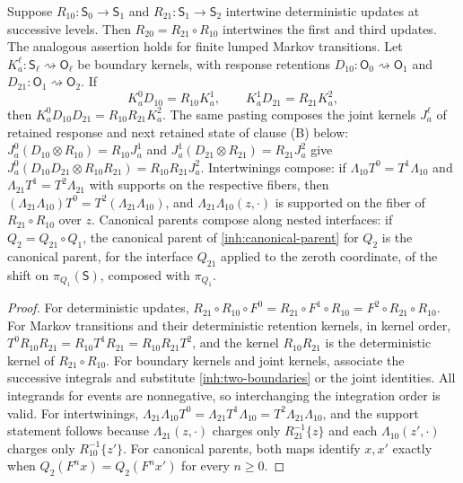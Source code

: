 Suppose $R_{10}:\mathsf S_0\to\mathsf S_1$ and
$R_{21}:\mathsf S_1\to\mathsf S_2$ intertwine deterministic updates at
successive levels. Then $R_{20}=R_{21}\circ R_{10}$ intertwines the first
and third updates. The analogous assertion holds for finite lumped Markov
transitions. Let $K_a^\ell:\mathsf S_\ell\rightsquigarrow\mathsf O_\ell$
be boundary kernels, with response retentions
$D_{10}:\mathsf O_0\rightsquigarrow\mathsf O_1$ and
$D_{21}:\mathsf O_1\rightsquigarrow\mathsf O_2$. If
\begin{equation}
 K_a^0D_{10}=R_{10}K_a^1,\qquad
 K_a^1D_{21}=R_{21}K_a^2,
 \label{inh:two-boundaries}
\end{equation}
then $K_a^0D_{10}D_{21}=R_{10}R_{21}K_a^2$. The same pasting composes the
joint kernels $J^\ell_a$ of retained response and next retained state of
clause (B) below: $J^0_a(D_{10}\otimes R_{10})=R_{10}J^1_a$ and
$J^1_a(D_{21}\otimes R_{21})=R_{21}J^2_a$ give
$J^0_a(D_{10}D_{21}\otimes R_{10}R_{21})=R_{10}R_{21}J^2_a$. Intertwinings
compose: if $\Lambda_{10}T^0=T^1\Lambda_{10}$ and
$\Lambda_{21}T^1=T^2\Lambda_{21}$ with supports on the respective fibers,
then $(\Lambda_{21}\Lambda_{10})T^0=T^2(\Lambda_{21}\Lambda_{10})$, and
$\Lambda_{21}\Lambda_{10}(z,\cdot)$ is supported on the fiber of
$R_{21}\circ R_{10}$ over $z$. Canonical parents compose along nested
interfaces: if $Q_2=Q_{21}\circ Q_1$, the canonical parent of
\cref{inh:canonical-parent} for $Q_2$ is the canonical parent, for the
interface $Q_{21}$ applied to the zeroth coordinate, of the shift on
$\pi_{Q_1}(\mathsf S)$, composed with $\pi_{Q_1}$.
\begin{proof}
For deterministic updates,
$R_{21}\circ R_{10}\circ F^0=R_{21}\circ F^1\circ R_{10}
=F^2\circ R_{21}\circ R_{10}$. For Markov transitions and their
deterministic retention kernels, in kernel order,
$T^0R_{10}R_{21}=R_{10}T^1R_{21}=R_{10}R_{21}T^2$, and the kernel
$R_{10}R_{21}$ is the deterministic kernel of $R_{21}\circ R_{10}$.
For boundary kernels and joint kernels, associate the successive integrals
and substitute \cref{inh:two-boundaries} or the joint identities. All
integrands for events are nonnegative, so interchanging the integration
order is valid. For intertwinings,
$\Lambda_{21}\Lambda_{10}T^0=\Lambda_{21}T^1\Lambda_{10}
=T^2\Lambda_{21}\Lambda_{10}$, and the support statement follows because
$\Lambda_{21}(z,\cdot)$ charges only $R_{21}^{-1}\{z\}$ and each
$\Lambda_{10}(z',\cdot)$ charges only $R_{10}^{-1}\{z'\}$. For canonical
parents, both maps identify $x,x'$ exactly when $Q_2(F^nx)=Q_2(F^nx')$ for
every $n\geq0$.
\end{proof}

